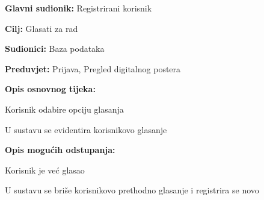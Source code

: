 					\noindent {}
					\begin{packed_item}
						
						\item \textbf{Glavni sudionik: } Registrirani korisnik
						\item  \textbf{Cilj:} Glasati za rad
						\item  \textbf{Sudionici:} Baza podataka
						\item  \textbf{Preduvjet:} Prijava, Pregled digitalnog postera
						\item  \textbf{Opis osnovnog tijeka:}
						
						\item[] \begin{packed_enum}
							
							\item Korisnik odabire opciju glasanja
							\item U sustavu se evidentira korisnikovo glasanje
						\end{packed_enum}
						
						\item  \textbf{Opis mogućih odstupanja:}
						
						\item[] \begin{packed_item}
							
							\item[2.a] Korisnik je već glasao
							\item[] \begin{packed_enum}
								\item U sustavu se briše korisnikovo prethodno glasanje i registrira se novo
							\end{packed_enum}
						\end{packed_item}
					\end{packed_item}
					

